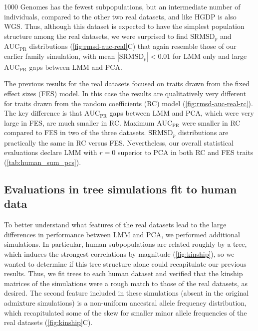 \documentclass[11pt]{article}
\newcommand{\rmsd}{\text{SRMSD}_p}
\newcommand{\auc}{\text{AUC}_\text{PR}}
\begin{document}
1000 Genomes has the fewest subpopulations, but an intermediate number of individuals, compared to the other two real datasets, and like HGDP is also WGS.
Thus, although this dataset is expected to have the simplest population structure among the real datasets, we were surprised to find $\rmsd$ and $\auc$ distributions (\cref{fig:rmsd-auc-real}C) that again resemble those of our earlier family simulation, with mean $|\rmsd| < 0.01$ for LMM only and large $\auc$ gaps between LMM and PCA.

The previous results for the real datasets focused on traits drawn from the fixed effect sizes (FES) model.
In this case the results are qualitatively very different for traits drawn from the random coefficients (RC) model (\cref{fig:rmsd-auc-real-rc}).
The key difference is that $\auc$ gaps between LMM and PCA, which were very large in FES, are much smaller in RC.
Maximum $\auc$ were smaller in RC compared to FES in two of the three datasets.
$\rmsd$ distributions are practically the same in RC versus FES.
Nevertheless, our overall statistical evaluations declare LMM with $r=0$ superior to PCA in both RC and FES traits (\cref{tab:human_sum_pcs}).

\subsection{Evaluations in tree simulations fit to human data}

To better understand what features of the real datasets lead to the large differences in performance between LMM and PCA, we performed additional simulations.
In particular, human subpopulations are related roughly by a tree, which induces the strongest correlations by magnitude (\cref{fig:kinship}), so we wanted to determine if this tree structure alone could recapitulate our previous results.
Thus, we fit trees to each human dataset and verified that the kinship matrices of the simulations were a rough match to those of the real datasets, as desired.
The second feature included in these simulations (absent in the original admixture simulations) is a non-uniform ancestral allele frequency distribution, which recapitulated some of the skew for smaller minor allele frequencies of the real datasets (\cref{fig:kinship}C).
\end{document}
